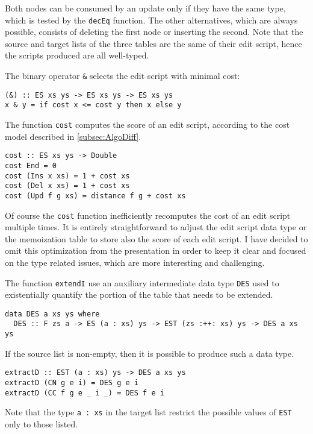 \documentclass[../Thesis.tex]{subfiles}
\begin{document}
	Both nodes can be consumed by an update only if they have the 
	same type, which is tested by the \texttt{decEq} function.
 	The other alternatives, which are always possible, consists of deleting
 	the first node or inserting the second. Note that the source and target
 	lists of the three tables are the same of their edit script, hence the scripts
 	produced are all well-typed.

	The binary operator \texttt{\&} selects the edit script with minimal cost:

\begin{verbatim}
(&) :: ES xs ys -> ES xs ys -> ES xs ys
x & y = if cost x <= cost y then x else y
\end{verbatim}

	The function \texttt{cost} computes the score of an edit script,
	according to the cost model described in \ref{subsec:AlgoDiff}.

\begin{verbatim}
cost :: ES xs ys -> Double	
cost End = 0
cost (Ins x xs) = 1 + cost xs
cost (Del x xs) = 1 + cost xs
cost (Upd f g xs) = distance f g + cost xs
\end{verbatim}

	Of course the \texttt{cost} function inefficiently recomputes the cost of an 
	edit script multiple times.
	It is entirely straightforward to adjust the edit script data type or the 
	memoization table to store also the score of each edit script.
	I have decided to omit this optimization from the presentation in order
	to keep it clear	and focused on the type related issues, which are 
	more interesting and challenging.
		
	The function \texttt{extendI} use an auxiliary intermediate 
	data type \texttt{DES} used to existentially quantify the portion of the table
	that needs to be extended.
	
\begin{verbatim}
data DES a xs ys where
  DES :: F zs a -> ES (a : xs) ys -> EST (zs :++: xs) ys -> DES a xs ys
\end{verbatim}

	If the source list is non-empty, then it is possible to produce such a
	data type.

\begin{verbatim}
extractD :: EST (a : xs) ys -> DES a xs ys
extractD (CN g e i) = DES g e i
extractD (CC f g e _ i _) = DES f e i
\end{verbatim}

	Note that the type \texttt{a : xs} in the target list restrict the possible
	values of \texttt{EST} only to those listed.
\end{document}
